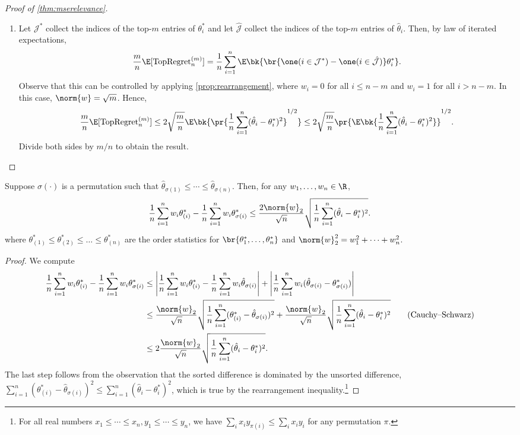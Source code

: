 \documentclass[12pt, reqno]{amsart}
\newcommand{\absauto}[1]{\left| #1 \right|}
\newcommand{\topmreg}{\mathrm{TopRegret}_{n}^{(m)}}
\numberwithin{equation}{section}
\begin{document}
\begin{appendices}
\begin{proof}[Proof of \cref{thm:mserelevance}]
\begin{enumerate}[wide]
\item Let $\mathcal J^*$ collect the indices of the top-$m$ entries of $\theta_i^*$ and
let $\hat {\mathcal J}$ collect the indices of the top-$m$ entries of $\hat\theta_i$.
Then,
by law of iterated expectations, \[
\frac{m}{n} \E [\topmreg] = \frac{1}{n}\sum_{i=1}^n \E \bk{\br{\one(i \in \mathcal J^*) -
\one(i \in
\hat{\mathcal J})} \theta_i^*}.
\]
Observe that this can be controlled by applying \cref{prop:rearrangement}, where $w_i = 0$
for all $i \le n-m$ and $w_i = 1$ for all $i > n-m$. In this case, $\norm{w} = \sqrt{m}$.
Hence, \[
\frac{m}{n}\E[\topmreg] \le 2\sqrt{\frac{m}{n}} \E\bk{\pr{\frac{1}{n} \sum_
{i=1}^n (\hat\theta_i - \theta^*_i)^2}^{1/2}} \le 2\sqrt{\frac{m}{n}} \pr{\E\bk{\frac{1}{n} \sum_
{i=1}^n (\hat\theta_i - \theta^*_i)^2}}^{1/2}.
\]
Divide both sides by $m/n$ to obtain the result.\qedhere
\end{enumerate}
\end{proof}

\begin{prop}
\label{prop:rearrangement}
Suppose $\sigma(\cdot)$ is a permutation such that $\hat\theta_
{\sigma(1)} \le \cdots \le \hat\theta_{\sigma(n)}
$. %
Then, for any $w_1,\ldots, w_n \in \R$,
\[
\frac{1}{n} \sum_{i=1}^n w_i \theta^*_{(i)} - \frac{1}{n} \sum_{i=1}^n w_i \theta^*_
{\sigma(i)} \le \frac{2\norm{w}_2}{\sqrt{n}} \sqrt{\frac{1}{n} \sum_
{i=1}^n (\hat\theta_i - \theta^*_i)^2}.
\]
where $\theta_{(1)}^* \le \theta_{(2)}^* \le \ldots \le \theta_{(n)}^*$ are the order
statistics for $\br{\theta_1^*,\ldots, \theta_n^*}$ and $ \norm{w}_2^2
= w_1^2 + \cdots + w_n^2$.
\end{prop}

\begin{proof}
We compute
\begin{align*}
\frac{1}{n} \sum_{i=1}^n w_i \theta^*_{(i)} - \frac{1}{n} \sum_{i=1}^n w_i \theta^*_
{\sigma(i)} &\le \absauto{\frac{1}{n}\sum_{i=1}^n w_i \theta_{(i)}^* - \frac{1}{n} \sum_
{i=1}^n w_i
\hat\theta_{\sigma
(i)}} + \absauto{\frac{1}{n} \sum_{i=1}^n w_i(\hat \theta_{\sigma(i)} - \theta^*_{\sigma
(i)}) }\\
& \le \frac{\norm{w}_2}{\sqrt{n}} \sqrt{\frac{1}{n} \sum_{i=1}^n (\theta_{(i)}^* -
\hat\theta_{\sigma(i)})^2} + \frac{\norm{w}_2}{\sqrt{n}} \sqrt{\frac{1}{n} \sum_
{i=1}^n (\hat\theta_i - \theta^*_i)^2} \tag{Cauchy--Schwarz}\\
& \le 2\frac{\norm{w}_2}{\sqrt{n}} \sqrt{\frac{1}{n} \sum_
{i=1}^n (\hat\theta_i - \theta^*_i)^2}.
\end{align*}
The last step follows from the observation that the sorted difference is dominated by the
unsorted difference, $
\sum_{i=1}^n (\theta_{(i)}^* -
\hat\theta_{\sigma(i)})^2 \le \sum_
{i=1}^n (\hat\theta_i - \theta^*_i)^2
$,
which is true by the rearrangement inequality.\footnote{For all real numbers $x_1 \le
\cdots \le x_n, y_1\le
\cdots \le y_n$, we have $\sum_i x_i y_{\pi(i)} \le \sum_i x_i y_i$ for any
permutation $\pi$.}
\end{proof}


\end{appendices}
\end{document}
